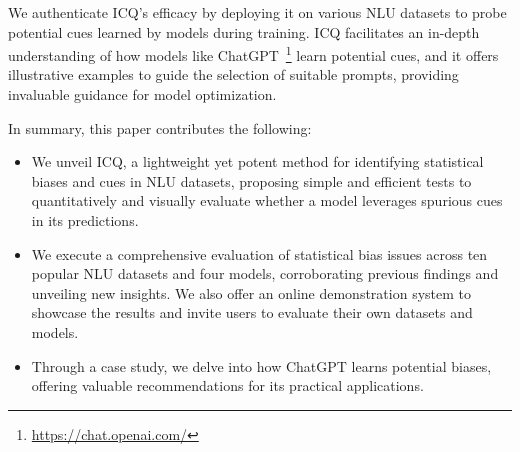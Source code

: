 We authenticate ICQ's efficacy by deploying it on various 
NLU datasets to probe potential cues learned by models during training. 
ICQ facilitates an in-depth understanding of how models like ChatGPT~\footnote{\url{https://chat.openai.com/}} 
learn potential cues, and it offers illustrative examples to guide the selection of suitable prompts, providing invaluable guidance for model optimization.

In summary, this paper contributes the following:

\begin{itemize}
\item We unveil ICQ, a lightweight yet potent method for identifying statistical biases and cues in NLU datasets, proposing simple and efficient tests to quantitatively and visually evaluate whether a model leverages spurious cues in its predictions.
\item We execute a comprehensive evaluation of statistical bias issues across ten popular NLU datasets and four models, corroborating previous findings and unveiling new insights. We also offer an online demonstration system to showcase the results and invite users to evaluate their own datasets and models.
\item Through a case study, we delve into how ChatGPT learns potential biases, offering valuable recommendations for its practical applications.
\end{itemize}





